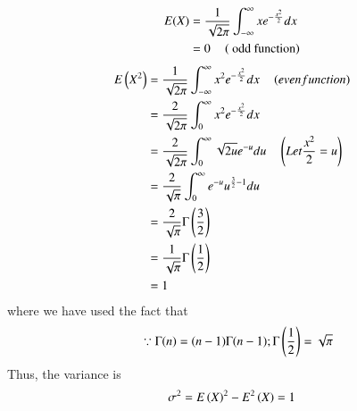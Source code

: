 %
\begin{align}
    E(X) &= \frac{1}{\sqrt{2\pi}} \int_{-\infty}^{\infty} x e^{-\frac{x^2}{2}}dx\\
    &=0 \quad \left( \text{ odd function}\right)
\end{align}
\begin{align}
    E\left(X^2\right)&= \frac{1}{\sqrt{2\pi}}\int_{-\infty}^{\infty} x^2
e^ {-\frac{x^2}{2}} dx \quad \left(even function\right)\\
    &= \frac{2}{\sqrt{2\pi}} \int_{0}^{\infty} x^2 e^{-\frac{x^2}{2}} dx\\
    &= \frac{2}{\sqrt{2\pi}}\int_{0}^{\infty}\sqrt{2u}e^{-u} du \quad\left(Let \frac{x^2}{2}= u\right)\\
    &= \frac{2}{\sqrt{\pi}} \int_{0}^{\infty} e^{-u} u^{\frac{3}{2}-1} du\\
    &= \frac{2}{\sqrt{\pi}} \Gamma\left({\frac{3}{2}}\right)\\
    &= \frac{1}{\sqrt{\pi}}\Gamma\left(\frac{1}{2}\right) \\
    &= 1
\end{align}
where we have used the fact that
\begin{align}
\quad\because \Gamma(n)= (n-1)\Gamma(n-1); \Gamma\left(\frac{1}{2}\right)=\sqrt{\pi}
\end{align}
%
Thus, the  variance is
\begin{align}
    \sigma^2 =  E\left(X\right)^2 - E^2\left(X\right) = 1
\end{align}
